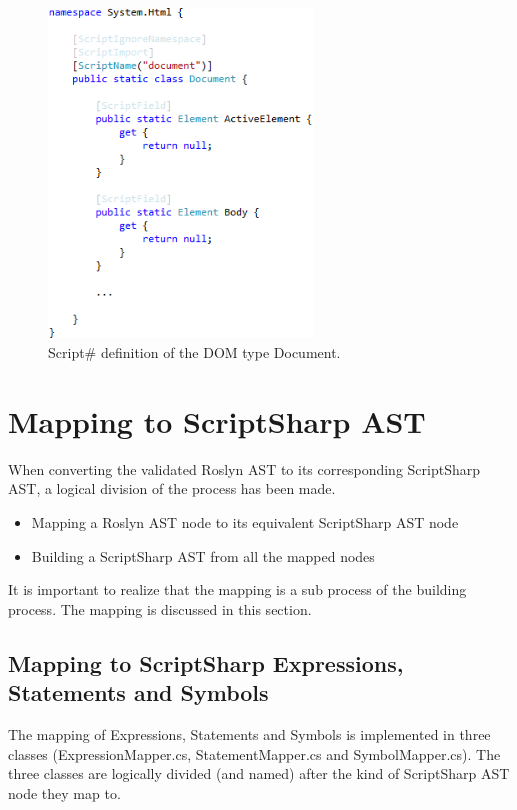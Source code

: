 		\begin{figure}[H]
				\includegraphics[width=7cm]{resources/images/Document.png}
			\caption{Script\# definition of the DOM type Document.}
			\label{fig:document}
		\end{figure}






\section{Mapping to ScriptSharp AST} %
\label{sec:mapping_to_scriptsharp_ast}
	When converting the validated Roslyn AST to its corresponding ScriptSharp AST, a logical division of the process has been made. 

	\begin{itemize}
		\item Mapping a Roslyn AST node to its equivalent ScriptSharp AST node
		\item Building a ScriptSharp AST from all the mapped nodes
	\end{itemize}

	It is important to realize that the mapping is a sub process of the building process. The mapping is discussed in this section. 

	\subsection{Mapping to ScriptSharp Expressions, Statements and Symbols} %
	\label{sub:subsection_mapping_to_scriptsharp_expressions_statements_and_symbols}
		The mapping of Expressions, Statements and Symbols is implemented in three classes (ExpressionMapper.cs, StatementMapper.cs and SymbolMapper.cs). The three classes are logically divided (and named) after the kind of ScriptSharp AST node they map to. 

